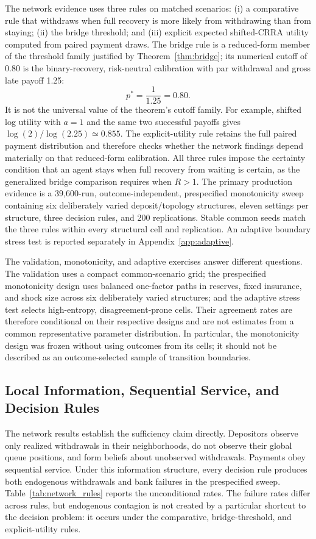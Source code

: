 \documentclass[12pt]{article}\usepackage[]{graphicx}\usepackage[]{xcolor}
\begin{document}
The network evidence uses three rules on matched scenarios: (i) a comparative rule that withdraws when full recovery is more likely from withdrawing than from staying; (ii) the bridge threshold; and (iii) explicit expected shifted-CRRA utility computed from paired payment draws.
The bridge rule is a reduced-form member of the threshold family justified by Theorem~\ref{thm:bridge}; its numerical cutoff of 0.80 is the binary-recovery, risk-neutral calibration with par withdrawal and gross late payoff 1.25: \[ p^*=\frac{1}{1.25}=0.80. \] It is not the universal value of the theorem's cutoff family.
For example, shifted log utility with $a=1$ and the same two successful payoffs gives $\log(2)/\log(2.25)\simeq0.855$.
The explicit-utility rule retains the full paired payment distribution and therefore checks whether the network findings depend materially on that reduced-form calibration.
All three rules impose the certainty condition that an agent stays when full recovery from waiting is certain, as the generalized bridge comparison requires when $R>1$.
The primary production evidence is a 39{,}600-run, outcome-independent, prespecified monotonicity sweep containing six deliberately varied deposit/topology structures, eleven settings per structure, three decision rules, and 200 replications.
Stable common seeds match the three rules within every structural cell and replication.
An adaptive boundary stress test is reported separately in Appendix~\ref{app:adaptive}.

The validation, monotonicity, and adaptive exercises answer different questions.
The validation uses a compact common-scenario grid; the prespecified monotonicity design uses balanced one-factor paths in reserves, fixed insurance, and shock size across six deliberately varied structures; and the adaptive stress test selects high-entropy, disagreement-prone cells.
Their agreement rates are therefore conditional on their respective designs and are not estimates from a common representative parameter distribution.
In particular, the monotonicity design was frozen without using outcomes from its cells; it should not be described as an outcome-selected sample of transition boundaries.

\subsection{Local Information, Sequential Service, and Decision Rules}

The network results establish the sufficiency claim directly.
Depositors observe only realized withdrawals in their neighborhoods, do not observe their global queue positions, and form beliefs about unobserved withdrawals.
Payments obey sequential service.
Under this information structure, every decision rule produces both endogenous withdrawals and bank failures in the prespecified sweep.
Table~\ref{tab:network_rules} reports the unconditional rates.
The failure rates differ across rules, but endogenous contagion is not created by a particular shortcut to the decision problem: it occurs under the comparative, bridge-threshold, and explicit-utility rules.
\end{document}
